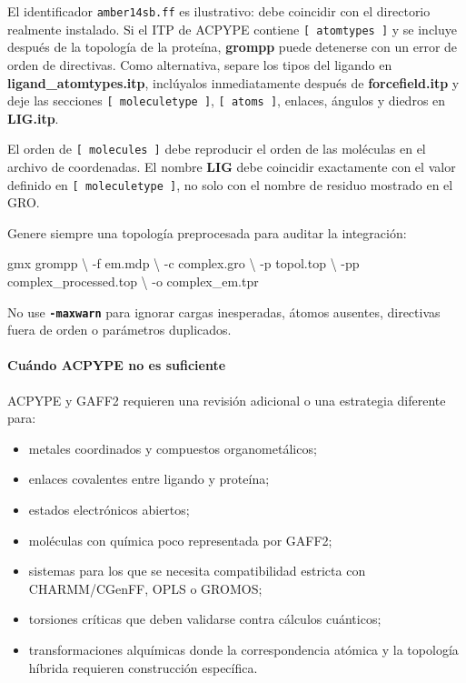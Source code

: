 \documentclass[
  spanish,
  11pt,
  a4paper]{article}
\newenvironment{Shaded}{\begin{snugshade}}{\end{snugshade}}
\newcommand{\AttributeTok}[1]{\textcolor[rgb]{0.13,0.29,0.53}{#1}}
\newcommand{\DataTypeTok}[1]{\textcolor[rgb]{0.13,0.29,0.53}{#1}}
\newcommand{\ExtensionTok}[1]{#1}
\newcommand{\NormalTok}[1]{#1}
\providecommand{\tightlist}{%
  \setlength{\itemsep}{0pt}\setlength{\parskip}{0pt}}
\begin{document}
El identificador \texttt{amber14sb.ff} es ilustrativo: debe coincidir
con el directorio realmente instalado. Si el ITP de ACPYPE contiene
\texttt{{[}\ atomtypes\ {]}} y se incluye después de la topología de la
proteína, \textbf{grompp} puede detenerse con un error de orden de
directivas. Como alternativa, separe los tipos del ligando en
\textbf{ligand\_atomtypes.itp}, inclúyalos inmediatamente después de
\textbf{forcefield.itp} y deje las secciones
\texttt{{[}\ moleculetype\ {]}}, \texttt{{[}\ atoms\ {]}}, enlaces,
ángulos y diedros en \textbf{LIG.itp}.

El orden de \texttt{{[}\ molecules\ {]}} debe reproducir el orden de las
moléculas en el archivo de coordenadas. El nombre \textbf{LIG} debe
coincidir exactamente con el valor definido en
\texttt{{[}\ moleculetype\ {]}}, no solo con el nombre de residuo
mostrado en el GRO.

Genere siempre una topología preprocesada para auditar la integración:

\begin{Shaded}
\begin{Highlighting}[]
\ExtensionTok{gmx}\NormalTok{ grompp }\DataTypeTok{\textbackslash{}}
    \AttributeTok{{-}f}\NormalTok{ em.mdp }\DataTypeTok{\textbackslash{}}
    \AttributeTok{{-}c}\NormalTok{ complex.gro }\DataTypeTok{\textbackslash{}}
    \AttributeTok{{-}p}\NormalTok{ topol.top }\DataTypeTok{\textbackslash{}}
    \AttributeTok{{-}pp}\NormalTok{ complex\_processed.top }\DataTypeTok{\textbackslash{}}
    \AttributeTok{{-}o}\NormalTok{ complex\_em.tpr}
\end{Highlighting}
\end{Shaded}

No use \textbf{\texttt{-maxwarn}} para ignorar cargas inesperadas,
átomos ausentes, directivas fuera de orden o parámetros duplicados.

\paragraph{Cuándo ACPYPE no es
suficiente}\label{cuuxe1ndo-acpype-no-es-suficiente}

ACPYPE y GAFF2 requieren una revisión adicional o una estrategia
diferente para:

\begin{itemize}
\tightlist
\item
  metales coordinados y compuestos organometálicos;
\item
  enlaces covalentes entre ligando y proteína;
\item
  estados electrónicos abiertos;
\item
  moléculas con química poco representada por GAFF2;
\item
  sistemas para los que se necesita compatibilidad estricta con
  CHARMM/CGenFF, OPLS o GROMOS;
\item
  torsiones críticas que deben validarse contra cálculos cuánticos;
\item
  transformaciones alquímicas donde la correspondencia atómica y la
  topología híbrida requieren construcción específica.
\end{itemize}
\end{document}

